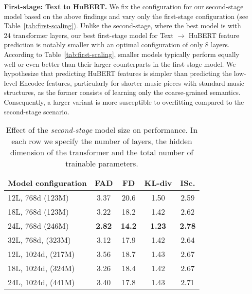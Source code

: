 \noindent\textbf{First-stage: Text to HuBERT.} We fix the configuration for our second-stage model based on the above findings and vary only the first-stage configuration (see Table~\ref{tab:first-scaling}).
Unlike the second-stage, where the best model is with 24 transformer layers, our best first-stage model for Text $\rightarrow$ HuBERT feature prediction is notably smaller with an optimal configuration of only 8 layers. According to Table~\ref{tab:first-scaling}, smaller models typically perform equally well or even better than their larger counterparts in the first-stage model. We hypothesize that predicting HuBERT features is simpler than predicting the low-level Encodec features, particularly for shorter music pieces with standard music structures, as the former consists of learning only the coarse-grained semantics. 
Consequently, a larger variant is more susceptible to overfitting compared to the second-stage scenario.

\begin{table}[htp]
\caption{Effect of the \emph{second-stage} model size  on performance. In each row we specify the number of layers, the hidden dimension of the transformer and the total number of trainable parameters.}
\label{tab:second-scaling}
\begin{center}
\begin{small}
\begin{sc}
\begin{tabular}{lcccc}
\toprule
Model configuration & FAD & FD & KL-div & ISc. \\
\midrule
12L, 768d (123M) & 3.37 & 20.6 & 1.50  & 2.59 \\
18L, 768d (123M) & 3.22 & 18.2  & 1.42  & 2.62 \\
24L, 768d (246M) & \textbf{2.82} & \textbf{14.2} & \textbf{1.23}& \textbf{2.78} \\
32L, 768d, (323M) & 3.12 & 17.9 & 1.42 & 2.64  \\
\midrule
12L, 1024d, (217M) & 3.56 & 18.7 & 1.43 & 2.67\\
18L, 1024d, (324M) & 3.26 & 18.4 & 1.42  & 2.67  \\
24L, 1024d, (441M) & 3.40 & 17.8 & 1.43 & 2.71 \\
\bottomrule
\end{tabular}
\end{sc}
\end{small}
\end{center}
\end{table}

